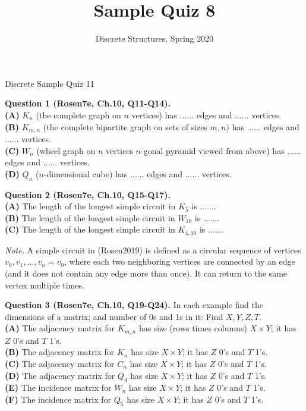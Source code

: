 \documentclass[jou]{apa6}
\title{Sample Quiz 8}
\author{Discrete Structures, Spring 2020}
\affiliation{RBS}
\begin{document}
\thispagestyle{empty}

\twocolumn
{\Large Discrete Sample Quiz 11}

{\bf Question 1 (Rosen7e, Ch.10, Q11-Q14).}\\
{\bf (A)} $K_n$ (the complete graph on $n$ vertices) has $\ldots\ldots$ edges and $\ldots\ldots$ vertices.\\
{\bf (B)} $K_{m,n}$ (the complete bipartite graph on sets of sizes $m,n$) has $\ldots\ldots$ edges and $\ldots\ldots$ vertices.\\
{\bf (C)} $W_n$ (wheel graph on $n$ vertices \textendash{} $n$-gonal pyramid
viewed from above) has $\ldots\ldots$ edges and $\ldots\ldots$ vertices.\\
{\bf (D)} $Q_n$ ($n$-dimensional cube) has $\ldots\ldots$ edges and $\ldots\ldots$ vertices.

\vspace{10pt}
{\bf Question 2 (Rosen7e, Ch.10, Q15-Q17).}\\
{\bf (A)} The length of the longest simple circuit in $K_5$ is $\ldots\ldots$.\\
{\bf (B)} The length of the longest simple circuit in $W_{10}$ is $\ldots\ldots$.\\
{\bf (C)} The length of the longest simple circuit in $K_{4,10}$ is $\ldots\ldots$.

{\em Note.} A simple circuit in (Rosen2019) is defined as a circular
sequence of vertices $v_0,v_1,\ldots,v_n=v_0$, 
where each two neighboring vertices are connected by an edge
(and it does not contain any edge more than once).
It can return to the same vertex multiple times.

\vspace{10pt}
{\bf Question 3 (Rosen7e, Ch.10, Q19-Q24).} In each example find 
the dimensions of a matrix; and number of 0s and 1s in it: Find $X,Y,Z,T$.\\
{\bf (A)} The adjacency matrix for $K_{m,n}$ has size (rows times columns)
$X \times Y$; it has $Z$ 0's and $T$ 1's.\\
{\bf (B)} The adjacency matrix for $K_n$  
has size $X \times Y$; it has $Z$ 0's and $T$ 1's.\\
{\bf (C)} The adjacency matrix for $C_n$  
has size $X \times Y$; it has $Z$ 0's and $T$ 1's.\\
{\bf (D)} The adjacency matrix for $Q_4$  
has size $X \times Y$; it has $Z$ 0's and $T$ 1's.\\
{\bf (E)} The incidence matrix for $W_n$ 
has size $X \times Y$; it has $Z$ 0's and $T$ 1's.\\
{\bf (F)} The incidence matrix for $Q_5$ 
has size $X \times Y$; it has $Z$ 0's and $T$ 1's.
\end{document}
